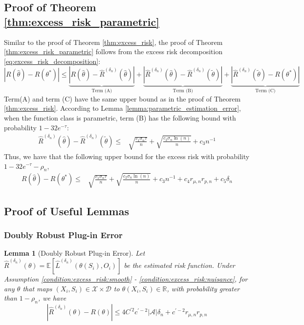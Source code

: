 \documentclass[12pt]{article}
\newtheorem{lemma}{Lemma}%
\newcommand{\E}{\mathbb{E}}
\newcommand{\R}{\mathbb{R}}
\begin{document}
\subsection{Proof of Theorem \ref{thm:excess_risk_parametric}}

Similar to the proof of Theorem \ref{thm:excess_risk}, the proof of Theorem \ref{thm:excess_risk_parametric} follows from the excess risk decomposition \eqref{eq:excess_risk_decomposition}:
$$ |R(\widehat\theta)-R\left(\theta^*\right)|\leq \underbrace{|R(\widehat\theta)-\widehat R^{({\delta_n})}(\widehat\theta)|}_{\text{Term (A)}} + \underbrace{|\widehat R^{({\delta_n})}(\widehat\theta) - \widehat R^{({\delta_n})}(\tilde\theta)|}_{\text{Term (B)}} + \underbrace{|\widehat R^{({\delta_n})}(\tilde\theta) - R(\theta^*)|}_{\text{Term (C)}} $$
Term(A) and term (C) have the same upper bound as in the proof of Theorem \ref{thm:excess_risk}. According to Lemma \ref{lemma:parametric_estimation_error}, when the function class is parametric, term (B) has the following bound with probability $1-32e^{-\tau}$:
\begin{align*}
    \widehat R^{({\delta_n})}(\widehat\theta) - \widehat R^{({\delta_n})}(\tilde\theta)\leq & \sqrt{\frac{c_1\sigma_n\tau}{n}} + \sqrt{\frac{ c_2\sigma_n\ln(n)}{n}}  + c_3n^{-1}
\end{align*}
Thus, we have that the following upper bound for the excess risk with probability $1-32e^{-\tau} - \rho_n$,
\begin{align*}
       R(\widehat\theta)-R\left(\theta^*\right)\leq &  \sqrt{\frac{c_1\sigma_n\tau}{n}} + \sqrt{\frac{ c_2\sigma_n\ln(n)}{n}}  + c_3n^{-1}+ c_4r_{\mu,n}r_{p,n} + c_5{\delta_n}
    \end{align*}

\subsection{Proof of Useful Lemmas}

\subsubsection{Doubly Robust Plug-in Error}

\begin{lemma}[Doubly Robust Plug-in Error]\label{lemma:risk_function_plug_in_error}
    Let $\widehat R^{({\delta_n})}(\theta) = \E[\widehat L^{({\delta_n})}(\theta(S_i),O_i)]$ be the estimated risk function. Under Assumption \ref{condition:excess_risk:smooth} - \ref{condition:excess_risk:nuisance}, for any $\theta$ that maps $(X_i,S_i)\in\mathcal{X}\times \mathcal{D}$ to $\theta(X_i,S_i)\in\R$, with probability greater than $1-\rho_n$,
    we have 
    $$|\widehat R^{({\delta_n})}(\theta) - R(\theta)|\leq 4C^{\prime2}c^{\prime-2}|\mathcal{A}|\delta_n + c^{\prime-2}r_{\mu,n}r_{p,n}$$
\end{lemma}
\end{document}
